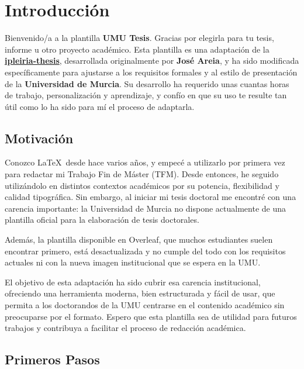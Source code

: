 \chapter[Introducción]{Introducción}
\label{cp:introduction}

\parindent0pt


Bienvenido/a a la plantilla \textcolor{maincolor}{\textbf{UMU Tesis}}. Gracias por elegirla para tu tesis, informe u otro proyecto académico. Esta plantilla es una adaptación de la \textbf{\href{https://github.com/joseareia/ipleiria-thesis}{ipleiria-thesis}}, desarrollada originalmente por \textbf{José Areia}, y ha sido modificada específicamente para ajustarse a los requisitos formales y al estilo de presentación de la \textbf{Universidad de Murcia}. Su desarrollo ha requerido unas cuantas horas de trabajo, personalización y aprendizaje, y confío en que su uso te resulte tan útil como lo ha sido para mí el proceso de adaptarla.

\section{Motivación}
Conozco \LaTeX~desde hace varios años, y empecé a utilizarlo por primera vez para redactar mi Trabajo Fin de Máster (TFM). Desde entonces, he seguido utilizándolo en distintos contextos académicos por su potencia, flexibilidad y calidad tipográfica. Sin embargo, al iniciar mi tesis doctoral me encontré con una carencia importante: la Universidad de Murcia no dispone actualmente de una plantilla oficial para la elaboración de tesis doctorales.

Además, la plantilla disponible en Overleaf, que muchos estudiantes suelen encontrar primero, está desactualizada y no cumple del todo con los requisitos actuales ni con la nueva imagen institucional que se espera en la UMU. 

El objetivo de esta adaptación ha sido cubrir esa carencia institucional, ofreciendo una herramienta moderna, bien estructurada y fácil de usar, que permita a los doctorandos de la UMU centrarse en el contenido académico sin preocuparse por el formato. Espero que esta plantilla sea de utilidad para futuros trabajos y contribuya a facilitar el proceso de redacción académica.

\section{Primeros Pasos}

